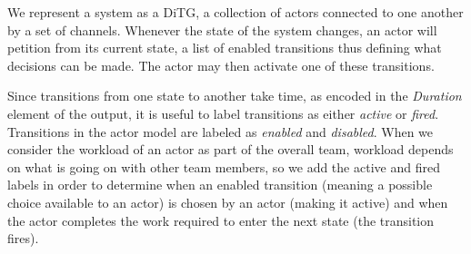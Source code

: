 %
%

%



We represent a system as a DiTG, a collection of
actors connected to one another by a set of channels.  Whenever the state of the
system changes, an actor will petition from its current state, a list of enabled
transitions thus defining what decisions can be made.  The actor may then
activate one of these transitions.  

Since transitions from one state to another take time, as encoded in the {\em Duration} element of the output, it is useful to label transitions as either {\em active} or {\em fired}. Transitions in the actor model are labeled as {\em enabled} and {\em disabled}. When we consider the workload of an actor as part of the overall team, workload depends on what is going on with other team members, so we add the active and fired labels in order to determine when an enabled transition (meaning a possible choice available to an actor) is chosen by an actor (making it active) and when the actor completes the work required to enter the next state (the transition fires).  


